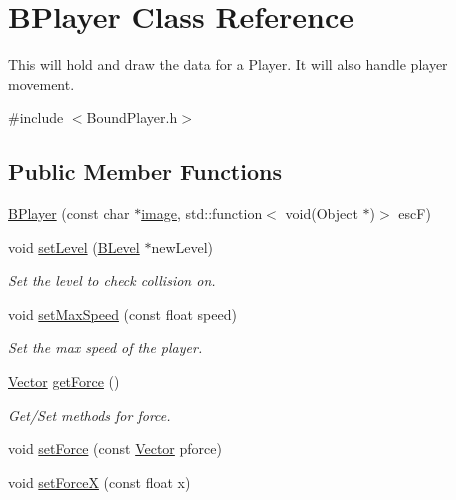 \hypertarget{class_b_player}{\section{\-B\-Player \-Class \-Reference}
\label{class_b_player}
}


\-This will hold and draw the data for a \-Player. \-It will also handle player movement.  




{\ttfamily \#include $<$\-Bound\-Player.\-h$>$}

\subsection*{\-Public \-Member \-Functions}
\begin{DoxyCompactItemize}
\item 
\hyperlink{class_b_player_ab32977496976aff5421f2af0d277aaf8}{\-B\-Player} (const char $\ast$\hyperlink{_game_list_8h_ac745ab21f82aa96829863dcfc37ef5a8}{image}, std\-::function$<$ void(\-Object $\ast$)$>$ esc\-F)
\item 
void \hyperlink{class_b_player_a03add0a9a55d81912897518d94daf52f}{set\-Level} (\hyperlink{class_b_level}{\-B\-Level} $\ast$new\-Level)
\begin{DoxyCompactList}\small\item\em \-Set the level to check collision on. \end{DoxyCompactList}\item 
void \hyperlink{class_b_player_ace0ec1b13a62c932950a86a469d0263f}{set\-Max\-Speed} (const float speed)
\begin{DoxyCompactList}\small\item\em \-Set the max speed of the player. \end{DoxyCompactList}\item 
\hyperlink{struct_vector}{\-Vector} \hyperlink{class_b_player_a33b7d635e3aa3c7a4796eabc4205cc58}{get\-Force} ()
\begin{DoxyCompactList}\small\item\em \-Get/\-Set methods for force. \end{DoxyCompactList}\item 
void \hyperlink{class_b_player_ae97ab8470903f7c595939f2331b6c6f4}{set\-Force} (const \hyperlink{struct_vector}{\-Vector} pforce)
\item 
void \hyperlink{class_b_player_af7ae69e5c1d7880a5ebf4bd38c1adabb}{set\-Force\-X} (const float x)
\item 

\end{DoxyCompactItemize}
